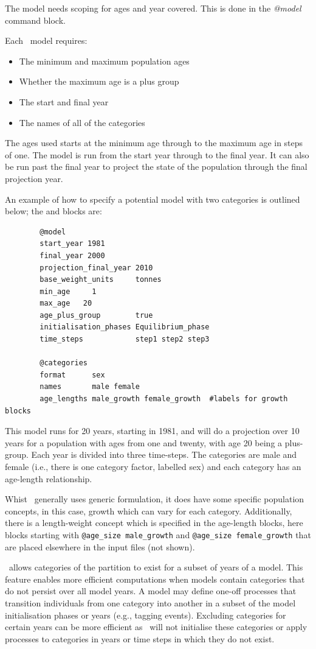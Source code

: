 The model needs scoping for ages and year covered. This is done in the \emph{@model} command block.

Each \CNAME\ model requires:

\begin{itemize}
\item The minimum and maximum population ages
\item Whether the maximum age is a plus group
\item The start and final year
\item The names of all of the categories
\end{itemize}

The ages used starts at the minimum age through to the maximum age in steps of one. The model is run from the start year through to the final year. It can also be run past the final year to project the state of the population through the final projection year.

An example of how to specify a potential model with two categories is outlined below;  the  and  blocks are:

{\small{\begin{verbatim}
		@model
		start_year 1981
		final_year 2000
		projection_final_year 2010
		base_weight_units     tonnes
		min_age     1
		max_age   20
		age_plus_group        true
		initialisation_phases Equilibrium_phase
		time_steps            step1 step2 step3

		@categories
		format      sex
		names       male female
		age_lengths male_growth female_growth  #labels for growth blocks
\end{verbatim}}}

This model runs for 20 years, starting in 1981, and will do a projection over 10 years for a population with ages from  one and twenty, with age 20 being a plus-group. Each year is divided into three time-steps. The categories are male and female (i.e., there is one category factor, labelled sex) and each category has an age-length relationship.

Whist \CNAME\ generally uses generic formulation, it does have some specific population concepts, in this case, growth which can vary for each category. Additionally, there is a  length-weight concept which is specified in the age-length blocks, here blocks starting with \texttt{@age\_size male\_growth} and \texttt{@age\_size female\_growth} that are placed elsewhere in the input files (not shown).

\CNAME\ allows categories of the partition to exist for a subset of years of a model. This feature enables more efficient computations when models contain categories that do not persist over all model years. A model may define one-off processes that transition individuals from one category into another in a subset of the model initialisation phases or years (e.g., tagging events). Excluding categories for certain years can be more efficient as \CNAME\ will not initialise these categories or apply processes to categories in years or time steps in which they do not exist.

